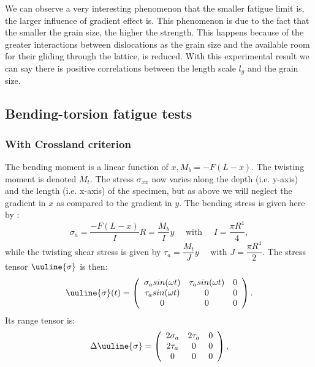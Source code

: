 We can observe a very interesting phenomenon that the smaller fatigue limit is, the larger influence of gradient effect is. This phenomenon is due to the fact that the smaller the grain size, the higher the strength. This happens because of the greater interactions between dislocations as the grain size and the available room for their gliding through the lattice, is reduced. With this experimental result we can say there is positive correlations between the length scale $l_g$ and the grain size. 


\subsection{Bending-torsion fatigue tests}
\subsubsection{With Crossland criterion}
The bending moment is a linear function of $x, M_b= -F(L-x)$. The twisting moment is denoted $M_t$. The stress $\sigma_{xx}$ now varies along the depth (i.e. y-axis) and the length (i.e. x-axis) of the specimen, but as above we will neglect the gradient in $x$ as compared to the gradient in $y$. The bending stress is given here by : 
\begin{equation}
	\sigma_{a}=\dfrac{-F(L-x)}{I}R=\dfrac{M_b}{I}y \quad \text{ with } \quad I=\dfrac{\pi R^4}{4},
\end{equation}
while the twisting shear stress is given by 
$ \tau_{a}=\dfrac{M_t}{J}y \quad \text{ with  }
J=\dfrac{\pi R^4}{2}$. 
The stress tensor $\uuline{\sigma}$ is then:
\begin{equation} 
	\uuline{\sigma}(t)=
	\left(
	\begin{array}{ccc}
		\sigma_{a}sin(\omega t) & \tau_asin(\omega t) & 0\\
		\tau_asin(\omega t) & 0 & 0\\ 
		0 & 0 & 0\\
	\end{array}\right) .
\end{equation}
Its range tensor is:
\begin{equation} 
	\Delta\uuline{\sigma}=
	\left(
	\begin{array}{ccc}
		2\sigma_a& 2\tau_a & 0\\
		2\tau_a& 0 & 0\\ 
		0 & 0 & 0\\
	\end{array}\right) ,
\end{equation}

